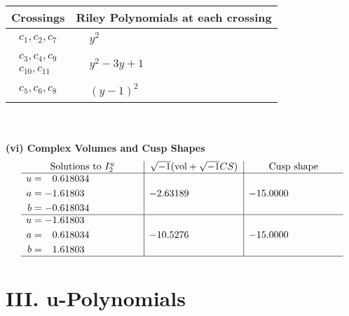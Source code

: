 \documentclass[1p]{elsarticle_modified}
\theoremstyle{definition}
\newcommand{\I}{\sqrt{-1}}
\begin{document}
\begin{tabular}{m{50pt}|m{274pt}}
Crossings & \hspace{64pt}Riley Polynomials at each crossing \\
\hline $$\begin{aligned}c_{1},c_{2},c_{7}\end{aligned}$$&$\begin{aligned}
&y^2
\end{aligned}$\\
\hline $$\begin{aligned}c_{3},c_{4},c_{9}\\c_{10},c_{11}\end{aligned}$$&$\begin{aligned}
&y^2-3 y+1
\end{aligned}$\\
\hline $$\begin{aligned}c_{5},c_{6},c_{8}\end{aligned}$$&$\begin{aligned}
&(y-1)^2
\end{aligned}$\\
\hline
\end{tabular}\\~\\
\newpage\flushleft \textbf{(vi) Complex Volumes and Cusp Shapes}
$$\begin{array}{c|c|c}  
\text{Solutions to }I^u_{2}& \I (\text{vol} + \sqrt{-1}CS) & \text{Cusp shape}\\
 \hline 
\begin{aligned}
u &= \phantom{-}0.618034\phantom{ +0.000000I} \\
a &= -1.61803\phantom{ +0.000000I} \\
b &= -0.618034\phantom{ +0.000000I}\end{aligned}
 & -2.63189\phantom{ +0.000000I} & -15.0000\phantom{ +0.000000I} \\ \hline\begin{aligned}
u &= -1.61803\phantom{ +0.000000I} \\
a &= \phantom{-}0.618034\phantom{ +0.000000I} \\
b &= \phantom{-}1.61803\phantom{ +0.000000I}\end{aligned}
 & -10.5276\phantom{ +0.000000I} & -15.0000\phantom{ +0.000000I}\\
 \hline 
 \end{array}$$\newpage
\newpage\renewcommand{\arraystretch}{1}
\centering \section*{ III. u-Polynomials}
\end{document}
